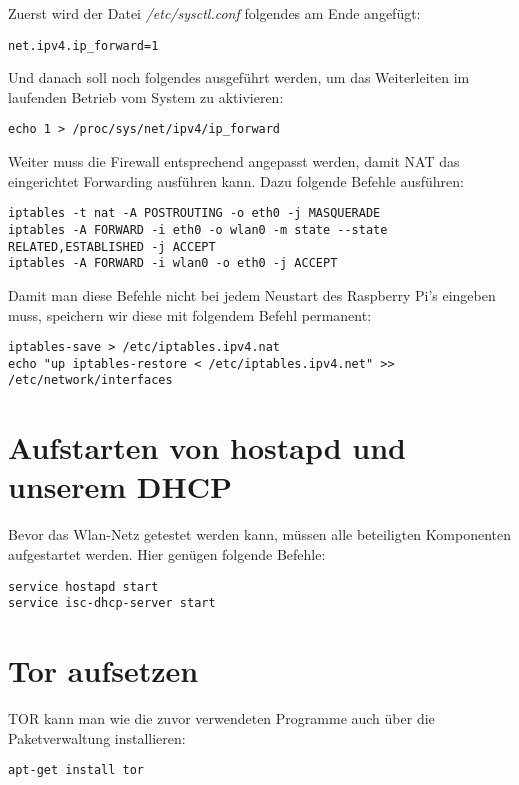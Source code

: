 Zuerst wird der Datei \textit{/etc/sysctl.conf} folgendes am Ende angefügt:

\begin{lstlisting}
net.ipv4.ip_forward=1
\end{lstlisting}

Und danach soll noch folgendes ausgeführt werden, um das Weiterleiten im laufenden Betrieb vom System zu aktivieren:

\begin{lstlisting}
echo 1 > /proc/sys/net/ipv4/ip_forward
\end{lstlisting}

Weiter muss die Firewall entsprechend angepasst werden, damit NAT das eingerichtet Forwarding ausführen kann.
Dazu folgende Befehle ausführen:

\begin{lstlisting}
iptables -t nat -A POSTROUTING -o eth0 -j MASQUERADE
iptables -A FORWARD -i eth0 -o wlan0 -m state --state RELATED,ESTABLISHED -j ACCEPT
iptables -A FORWARD -i wlan0 -o eth0 -j ACCEPT
\end{lstlisting}

Damit man diese Befehle nicht bei jedem Neustart des Raspberry Pi's eingeben muss, speichern wir diese mit folgendem Befehl permanent:

\begin{lstlisting}
iptables-save > /etc/iptables.ipv4.nat
echo "up iptables-restore < /etc/iptables.ipv4.net" >> /etc/network/interfaces
\end{lstlisting}

\section{Aufstarten von hostapd und unserem DHCP}
Bevor das Wlan-Netz getestet werden kann, müssen alle beteiligten Komponenten aufgestartet werden.
Hier genügen folgende Befehle:

\begin{lstlisting}
service hostapd start
service isc-dhcp-server start
\end{lstlisting}

\section{Tor aufsetzen}
TOR kann man wie die zuvor verwendeten Programme auch über die Paketverwaltung installieren:

\begin{lstlisting}
apt-get install tor
\end{lstlisting}

